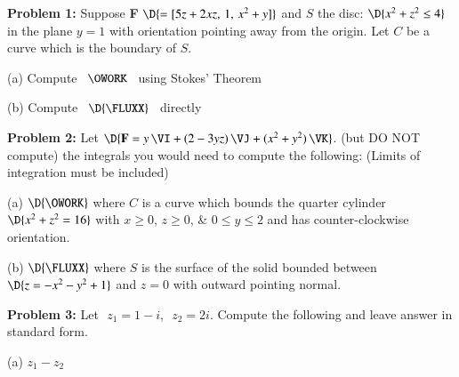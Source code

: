 \documentclass[11pt]{article}
\begin{document}
\vspace{1.0cm}

\thispagestyle{empty}
\newpage
\thispagestyle{empty}

{\bf Problem 1:} Suppose {\bf F} $\D{= [5z+2xz,\, 1,\, x^2+y]}$ and $S$ the disc: $\D{x^2 + z^2 \le 4}$ in the plane $y = 1$ with orientation pointing away from the origin.  Let $C$ be a curve which is the boundary of $S$.  

\vspace{0.2cm}

(a) Compute \, $\OWORK$ \, using Stokes' Theorem

(b) Compute \, $\D{\FLUXX}$ \, directly

\thispagestyle{empty}
\newpage
\thispagestyle{empty}

{\bf Problem 2:} Let $\D{{\bf F} = y\,\VI + (2-3yz)\, \VJ + (x^2+y^2)\, \VK}$.   (but DO NOT compute) the integrals you would need to compute the following: (Limits of integration must be included)

\vspace{0.2cm}

(a) $\D{\OWORK}$ where $C$ is a curve which bounds the quarter cylinder $\D{x^2 + z^2 = 16}$ with $x\ge 0$, $z\ge 0$, \& $0 \le y \le 2$ and has counter-clockwise orientation.

\vspace{0.2cm}

(b) $\D{\FLUXX}$ where $S$ is the surface of the solid bounded between $\D{z = - x^2 - y^2 + 1}$ and $z=0$ with outward pointing normal.

\thispagestyle{empty}
\newpage
\thispagestyle{empty}

%

{\bf Problem 3:} Let \,\,$z_1 = 1-i$,\,\, $z_2 = 2i$.  \quad Compute the following and leave answer in standard form.

\vspace{0.1cm}

(a) \quad $z_1 - z_2$
\end{document}

